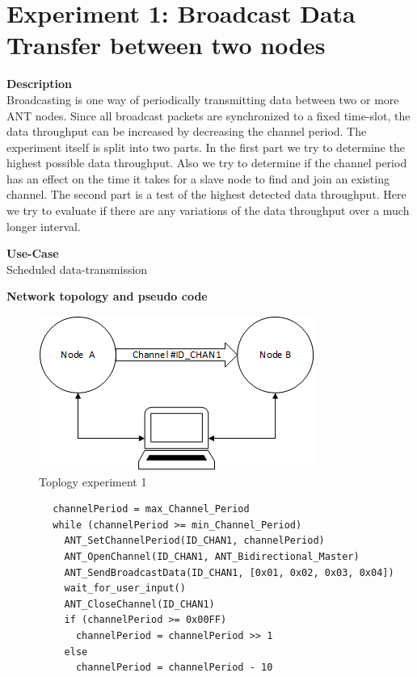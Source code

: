 \section{Experiment 1: Broadcast Data Transfer between two nodes}
\begin{description} 
	\item{\textbf{Description}} \hfill \\ Broadcasting is one way of periodically transmitting data between two or more ANT nodes. Since all broadcast packets are synchronized to a fixed time-slot, the data throughput can be increased by decreasing the channel period. The experiment itself is split into two parts. In the first part we try to determine the highest possible data throughput. Also we try to determine if the channel period has an effect on the time it takes for a slave node to find and join an existing channel. The second part is a test of the highest detected data throughput. Here we try to evaluate if there are any variations of the data throughput over a much longer interval.	
	\item{\textbf{Use-Case}} \hfill \\ Scheduled data-transmission	
	\item{\textbf{Network topology and pseudo code}} \hfill \\ 
	\begin{figure}[H]
		\centering
		\includegraphics[scale=1]{content/images/exp_topo.png}
		\caption{Toplogy experiment 1}
	\end{figure}
	\begin{code}[H]
		\begin{verbatim}
		channelPeriod = max_Channel_Period
		while (channelPeriod >= min_Channel_Period)
		  ANT_SetChannelPeriod(ID_CHAN1, channelPeriod)
		  ANT_OpenChannel(ID_CHAN1, ANT_Bidirectional_Master)
		  ANT_SendBroadcastData(ID_CHAN1, [0x01, 0x02, 0x03, 0x04])
		  wait_for_user_input()
		  ANT_CloseChannel(ID_CHAN1)
		  if (channelPeriod >= 0x00FF)
		    channelPeriod = channelPeriod >> 1
		  else
		    channelPeriod = channelPeriod - 10
		\end{verbatim}
		\caption{Broadcast data single channel (Master)}\label{lst:mExp1}
	\end{code}
	

\end{description}
